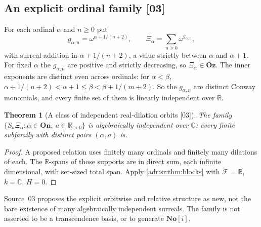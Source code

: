 \documentclass[11pt,letterpaper]{article}
\numberwithin{equation}{section}
\newtheorem{theorem}{Theorem}[section]
\theoremstyle{definition}
\theoremstyle{remark}
\newcommand{\Oz}{\mathbf{Oz}}
\newcommand{\SC}{\mathbf{No}[i]}
\newcommand{\C}{\mathbb C}
\newcommand{\R}{\mathbb R}
\newcommand{\src}[1]{\textup{[#1]}}%
\begin{document}
\subsection{An explicit ordinal family \src{03}}

For each ordinal $\alpha$ and $n\ge0$ put
\begin{equation}\label{adr:sr:eq:ordinal}
 g_{\alpha,n}=\omega^{\alpha+1/(n+2)},\qquad \Xi_\alpha=\sum_{n\ge0}\omega^{g_{\alpha,n}},
\end{equation}
with surreal addition in $\alpha+1/(n+2)$, a value strictly between $\alpha$ and
$\alpha+1$. For fixed $\alpha$ the $g_{\alpha,n}$ are positive and strictly
decreasing, so $\Xi_\alpha\in\Oz$. The inner exponents are distinct even across
ordinals: for $\alpha<\beta$,
$\alpha+1/(n+2)<\alpha+1\le\beta<\beta+1/(m+2)$. So the $g_{\alpha,n}$ are
distinct Conway monomials, and every finite set of them is linearly
independent over $\R$.

\begin{theorem}[A class of independent real-dilation orbits \src{03}]
\label{adr:sr:thm:ordinal}
The family $\{S_a\Xi_\alpha:\alpha\in\mathbf{On},\ a\in\R_{>0}\}$ is
algebraically independent over $\C$: every finite subfamily with distinct
pairs $(\alpha,a)$ is.
\end{theorem}
\begin{proof}
A proposed relation uses finitely many ordinals and finitely many dilations of
each. The $\R$-spans of those supports are in direct sum, each infinite
dimensional, with set-sized total span. Apply \cref{adr:sr:thm:blocks} with
$\mathcal F=\R$, $k=\C$, $H=0$.
\end{proof}

Source~03 proposes the explicit orbitwise and relative structure as new, not
the bare existence of many algebraically independent surreals. The family is
not asserted to be a transcendence basis, or to generate $\SC$.
\end{document}
